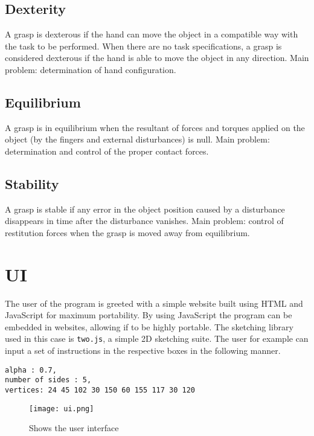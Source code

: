 \documentclass[letterpaper, 10 pt, conference]{ieeeconf}
\begin{document}
    \subsection{Dexterity}
    
    A grasp is dexterous if the hand can move the object in a compatible way with the task to be performed. When there are no task specifications, a grasp is considered dexterous if the hand is able to move the object in any direction. Main problem: determination of hand configuration.
    
    \subsection{Equilibrium}
    
    A grasp is in equilibrium when the resultant of forces and torques applied on the object (by the fingers and external disturbances) is null. Main problem: determination and control of the proper contact forces.
    
    \subsection{Stability}
    
    A grasp is stable if any error in the object position caused by a disturbance disappears in time after the disturbance vanishes. Main problem: control of restitution forces when the grasp is moved away from equilibrium.
    
    
    
    
    \section{UI}
    The user of the program is greeted with a simple website built using HTML and JavaScript for maximum portability. By using JavaScript the program can be embedded in websites, allowing if to be highly portable. The sketching library used in this case is {\tt two.js}, a simple 2D sketching suite. The user for example can input a set of instructions in the respective boxes in the following manner.
    
    {\tt\small alpha : 0.7,\\ number of sides : 5,\\ vertices: 24 45 102 30 150 60 155 117 30 120}
    
    
    \begin{figure}[h]
    \caption{Shows the user interface}
    \centering
    \texttt{[image: ui.png]}
    \end{figure}
    
\end{document}
